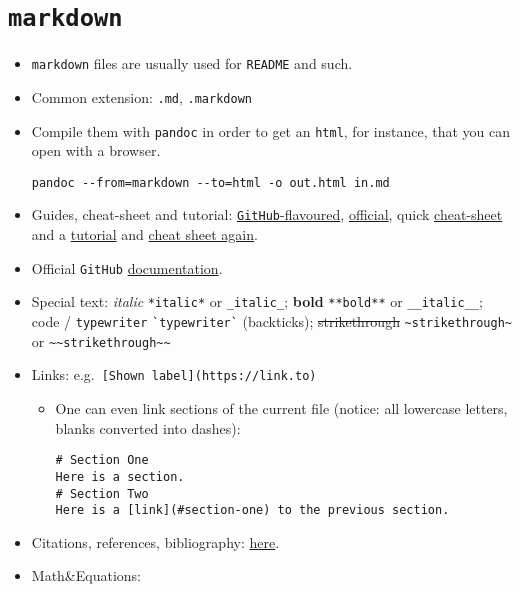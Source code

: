 \documentclass[a4paper,12pt,%
              final%
              ]{article}
\begin{document}
\section{\texttt{markdown}}
\label{sec:markdown}
\begin{itemize}
  \item \texttt{markdown} files are usually used for \texttt{README} and such.
  \item Common extension: \texttt{.md}, \texttt{.markdown}
  \item Compile them with \texttt{pandoc} in order to get an \texttt{html}, for instance, that you can open with a browser.
\begin{verbatim}
pandoc --from=markdown --to=html -o out.html in.md
\end{verbatim}
  \item Guides, cheat-sheet and tutorial:
    \href{https://github.com/adam-p/markdown-here/wiki/Markdown-Cheatsheet}{\texttt{GitHub}-flavoured},
    \href{https://daringfireball.net/projects/markdown/syntax}{official}, quick
    \href{https://commonmark.org/help/}{cheat-sheet} and a
    \href{https://agea.github.io/tutorial.md/}{tutorial} and
    \href{https://enterprise.github.com/downloads/en/markdown-cheatsheet.pdf}{cheat sheet again}.
  \item Official \texttt{GitHub} \href{https://docs.github.com/en/github/writing-on-github/basic-writing-and-formatting-syntax}{documentation}.
  \item Special text: \textit{italic} \verb|*italic*| or \verb|_italic_|; \textbf{bold} \verb|**bold**| or \verb|__italic__|; code / \texttt{typewriter} \verb|`typewriter`| (backticks); \sout{strikethrough} \verb|~strikethrough~| or \verb|~~strikethrough~~|
    \item Links: e.g.\ \verb|[Shown label](https://link.to)|
      \begin{itemize}
        \item One can even link sections of the current file (notice: all lowercase letters, blanks converted into dashes):
\begin{verbatim}
# Section One
Here is a section.
# Section Two
Here is a [link](#section-one) to the previous section.
\end{verbatim}
      \end{itemize}
  \item Citations, references, bibliography: \href{https://stackoverflow.com/questions/26587527/cite-a-paper-using-github-markdown-syntax}{here}.
  \item Math\&Equations:

\end{itemize}
\end{document}
